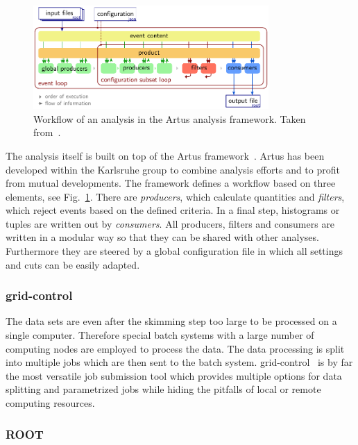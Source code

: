 \begin{figure}[htp]
    \centering
    \includegraphics[width=0.8\textwidth]{figures/experimental_setup/artus_workflow.pdf}
    \caption[Workflow of an analysis in the Artus framework]{Workflow of an
        analysis in the Artus analysis framework. Taken
        from~\cite{Berger:2014aca}.}
    \label{fig:artus_workflow}
\end{figure}

The analysis itself is built on top of the Artus framework~\cite{Berger:2015qao}.
Artus has been developed within the Karlsruhe group to combine analysis efforts
and to profit from mutual developments. The framework defines a workflow based
on three elements, see Fig.~\ref{fig:artus_workflow}. There are
\emph{producers}, which calculate quantities and \emph{filters}, which reject
events based on the defined criteria. In a final step, histograms or tuples are
written out by \emph{consumers}. All producers, filters and consumers are
written in a modular way so that they can be shared with other analyses.
Furthermore they are steered by a global configuration file in which all
settings and cuts can be easily adapted.

\subsubsection{grid-control}

The data sets are even after the skimming step too large to be processed on a
single computer. Therefore special batch systems with a large number of
computing nodes are employed to process the data. The data processing is split
into multiple jobs which are then sent to the batch system.
grid-control~\cite{Gridcontrol:2015aa} is by far the most versatile job
submission tool which provides multiple options for data splitting and
parametrized jobs while hiding the pitfalls of local or remote computing
resources.

\subsubsection{ROOT}

